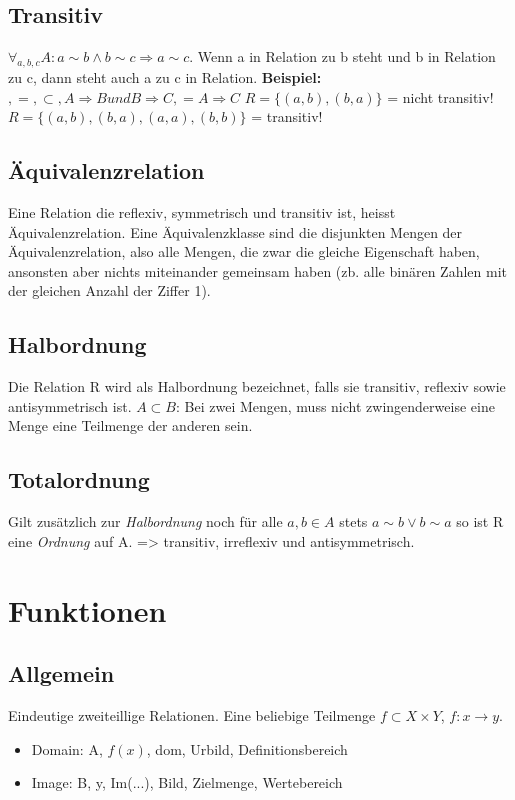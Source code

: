 \subsection{Transitiv}
\( \forall_{a,b,c} A: a \sim b \wedge b \sim c \Rightarrow a \sim c \).
    Wenn a in Relation zu b steht und b in Relation zu c, dann steht auch a
    zu c in Relation.\newline
    \textbf{Beispiel:} \(<,>,=,\subset, A \Rightarrow B und B \Rightarrow
    C, = A \Rightarrow C\)\newline
    \( R = \{(a,b),(b,a) \}\) = nicht transitiv! \newline
    \( R = \{(a,b),(b,a),(a,a),(b,b) \}\) = transitiv!

\subsection{Äquivalenzrelation}
Eine Relation die reflexiv, symmetrisch und transitiv ist, heisst
    Äquivalenzrelation.\newline
    Eine Äquivalenzklasse sind die disjunkten Mengen der Äquivalenzrelation, also alle Mengen, die zwar die gleiche Eigenschaft haben, ansonsten aber nichts miteinander gemeinsam haben (zb. alle binären Zahlen mit der gleichen Anzahl der Ziffer 1).

\subsection{Halbordnung}
Die Relation R wird als Halbordnung bezeichnet, falls sie transitiv,
    reflexiv sowie antisymmetrisch ist.\newline
    \(A \subset B\): Bei zwei Mengen, muss nicht zwingenderweise eine Menge
    eine Teilmenge der anderen sein.

\subsection{Totalordnung}
Gilt zusätzlich zur \emph{Halbordnung} noch für alle \(a,b \in A\)
    stets \(a \sim b \vee b \sim a\) so ist R eine \emph{Ordnung} auf A. =>
    transitiv, irreflexiv und antisymmetrisch.
    
\section{Funktionen}
\subsection{Allgemein}
    Eindeutige zweiteillige Relationen. Eine beliebige Teilmenge \(f
    \subset X \times Y \), \(f: x \rightarrow y \).\newline
    \begin{itemize}
      \item Domain: A, \(f(x)\), dom, Urbild, Definitionsbereich
      \item Image: B, y, Im(...), Bild, Zielmenge, Wertebereich
    \end{itemize}


